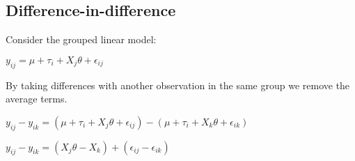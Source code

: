 
\subsection{Difference-in-difference}

Consider the grouped linear model: 

\(y_{ij}=\mu+\tau_i+X_{j}\theta +\epsilon_{ij}\)

By taking differences with another observation in the same group we remove the average terms.

\(y_{ij}-y_{ik}=(\mu+\tau_i+X_{j}\theta +\epsilon_{ij})- (\mu + \tau_i + X_{k}\theta + \epsilon_{ik})\)

\(y_{ij}-y_{ik}=(X_{j}\theta - X_{k})+(\epsilon_{ij}- \epsilon_{ik})\)

